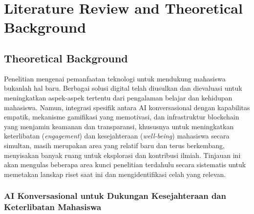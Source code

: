 \chapter{Literature Review and Theoretical Background}


\section{Theoretical Background}
\label{sec:theoretical_background}

Penelitian mengenai pemanfaatan teknologi untuk mendukung mahasiswa bukanlah hal baru. Berbagai solusi digital telah diusulkan dan dievaluasi untuk meningkatkan aspek-aspek tertentu dari pengalaman belajar dan kehidupan mahasiswa. Namun, integrasi spesifik antara AI konversasional dengan kapabilitas empatik, mekanisme gamifikasi yang memotivasi, dan infrastruktur blockchain yang menjamin keamanan dan transparansi, khususnya untuk meningkatkan keterlibatan (\textit{engagement}) dan kesejahteraan (\textit{well-being}) mahasiswa secara simultan, masih merupakan area yang relatif baru dan terus berkembang, menyisakan banyak ruang untuk eksplorasi dan kontribusi ilmiah. Tinjauan ini akan mengulas beberapa area kunci penelitian terdahulu secara sistematis untuk memetakan lanskap riset saat ini dan mengidentifikasi celah yang relevan.

\subsection{AI Konversasional untuk Dukungan Kesejahteraan dan Keterlibatan Mahasiswa} 
\label{subsec:ai_konversasional_tinjauan_revised}

